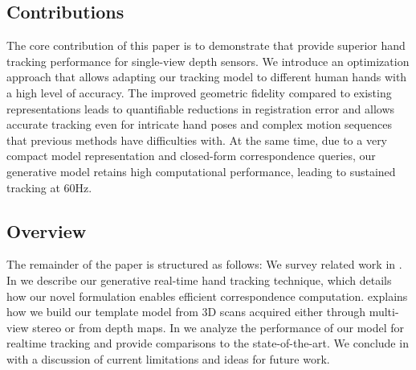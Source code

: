 \subsection*{Contributions}
%
The core contribution of this paper is to demonstrate that  provide superior hand tracking performance for single-view depth sensors. 
We introduce an optimization approach that allows adapting our tracking model to different human hands with a high level of accuracy. 
The improved geometric fidelity compared to existing representations leads to quantifiable reductions in registration error and allows accurate tracking even for intricate hand poses and complex motion sequences that previous methods have difficulties with. 
At the same time, due to a very compact model representation and closed-form correspondence queries, our generative model retains high computational performance, leading to sustained tracking at 60Hz.

\subsection*{Overview}
The remainder of the paper is structured as follows: We survey related work in . In  we describe our generative real-time hand tracking technique, which details how our novel formulation enables efficient correspondence computation.
% 
 explains how we build our template model from 3D scans acquired either through multi-view stereo or from depth maps.
% 
In  we analyze the performance of our model for realtime tracking and provide comparisons to the state-of-the-art. 
% 
We conclude in  with a discussion of current limitations and ideas for future work.


